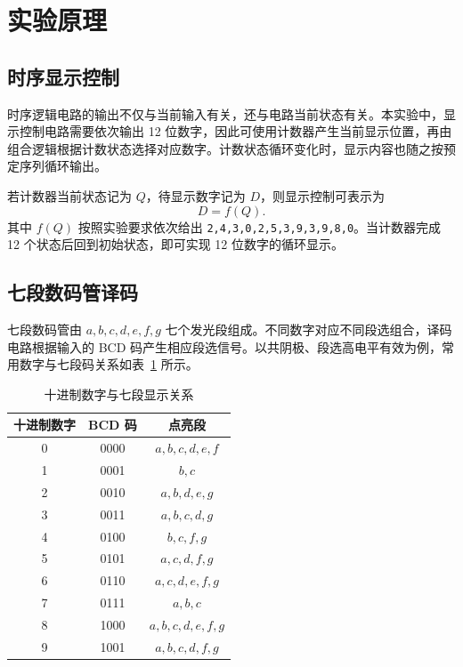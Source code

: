 \documentclass{ctexrep}
\begin{document}
\section{实验原理}

\subsection{时序显示控制}

时序逻辑电路的输出不仅与当前输入有关，还与电路当前状态有关。本实验中，显示控制电路需要依次输出 12 位数字，因此可使用计数器产生当前显示位置，再由组合逻辑根据计数状态选择对应数字。计数状态循环变化时，显示内容也随之按预定序列循环输出。

若计数器当前状态记为 $Q$，待显示数字记为 $D$，则显示控制可表示为
\[
    D = f(Q).
\]
其中 $f(Q)$ 按照实验要求依次给出 \texttt{2,4,3,0,2,5,3,9,3,9,8,0}。当计数器完成 12 个状态后回到初始状态，即可实现 12 位数字的循环显示。

\subsection{七段数码管译码}

七段数码管由 $a,b,c,d,e,f,g$ 七个发光段组成。不同数字对应不同段选组合，译码电路根据输入的 BCD 码产生相应段选信号。以共阴极、段选高电平有效为例，常用数字与七段码关系如表~\ref{e3:tab:segment_code} 所示。

\begin{table}[H]
    \centering
    \caption{十进制数字与七段显示关系}
    \label{e3:tab:segment_code}
    \begin{tabular}{c c c}
        \toprule
        \textbf{十进制数字} & \textbf{BCD 码} & \textbf{点亮段} \\
        \midrule
        0 & 0000 & $a,b,c,d,e,f$ \\
        1 & 0001 & $b,c$ \\
        2 & 0010 & $a,b,d,e,g$ \\
        3 & 0011 & $a,b,c,d,g$ \\
        4 & 0100 & $b,c,f,g$ \\
        5 & 0101 & $a,c,d,f,g$ \\
        6 & 0110 & $a,c,d,e,f,g$ \\
        7 & 0111 & $a,b,c$ \\
        8 & 1000 & $a,b,c,d,e,f,g$ \\
        9 & 1001 & $a,b,c,d,f,g$ \\
        \bottomrule
    \end{tabular}
\end{table}
\end{document}
